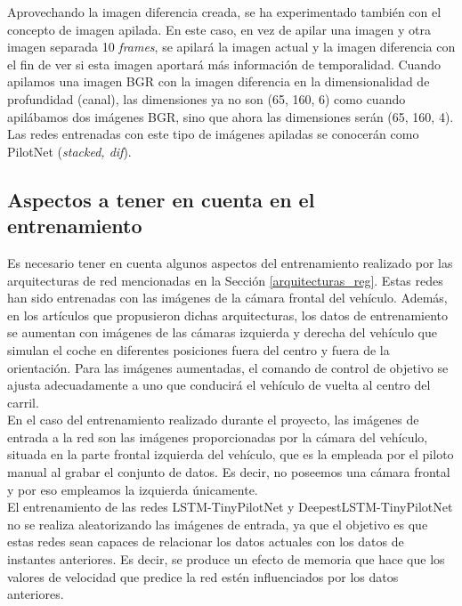 Aprovechando la imagen diferencia creada, se ha experimentado también con el concepto de imagen apilada. En este caso, en vez de apilar una imagen y otra imagen separada 10 \textit{frames}, se apilará la imagen actual y la imagen diferencia con el fin de ver si esta imagen aportará más información de temporalidad. Cuando apilamos una imagen BGR con la imagen diferencia en la dimensionalidad de profundidad (canal), las dimensiones ya no son (65, 160, 6) como cuando apilábamos dos imágenes BGR, sino que ahora las dimensiones serán (65, 160, 4). Las redes entrenadas con este tipo de imágenes apiladas se conocerán como PilotNet (\textit{stacked, dif}). \\


\subsection{Aspectos a tener en cuenta en el entrenamiento}

Es necesario tener en cuenta algunos aspectos del entrenamiento realizado por las arquitecturas de red mencionadas en la Sección \ref{arquitecturas_reg}. Estas redes han sido entrenadas con las imágenes de la cámara frontal del vehículo. Además, en los artículos que propusieron dichas arquitecturas, los datos de entrenamiento se aumentan con imágenes de las cámaras izquierda y derecha del vehículo que simulan el coche en diferentes posiciones fuera del centro y fuera de la orientación. Para las imágenes aumentadas, el comando de control de objetivo se ajusta adecuadamente a uno que conducirá el vehículo de vuelta al centro del carril.\\

En el caso del entrenamiento realizado durante el proyecto, las imágenes de entrada a la red son las imágenes proporcionadas por la cámara del vehículo, situada en la parte frontal izquierda del vehículo, que es la empleada por el piloto manual al grabar el conjunto de datos. Es decir, no poseemos una cámara frontal y por eso empleamos la izquierda únicamente.\\ 

El entrenamiento de las redes LSTM-TinyPilotNet y DeepestLSTM-TinyPilotNet no se realiza aleatorizando las imágenes de entrada, ya que el objetivo es que estas redes sean capaces de relacionar los datos actuales con los datos de instantes anteriores. Es decir, se produce un efecto de memoria que hace que los valores de velocidad que predice la red estén influenciados por los datos anteriores.\\

